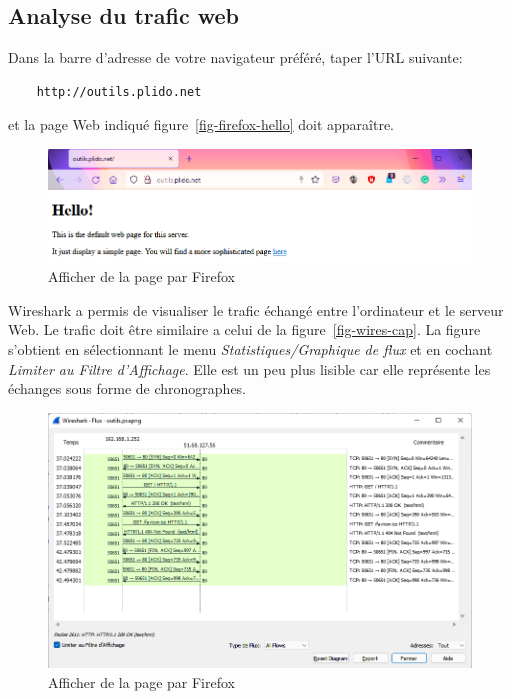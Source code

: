 \subsection{Analyse du trafic web}

Dans la barre d'adresse de votre navigateur préféré, taper l'URL suivante:

\begin{verbatim}
    http://outils.plido.net
\end{verbatim}

\noindent et la page Web indiqué figure~\vref{fig-firefox-hello} doit apparaître. 

\begin{figure}[tbp]
\centerline{\includegraphics[width=1\columnwidth]{Pictures/firefox-simple.png}}
\caption{Afficher de la page par Firefox}
\label{fig-firefox-hello}
\end{figure}

  \vspace{1em}

Wireshark a permis de visualiser le trafic échangé entre l'ordinateur et le serveur Web. Le trafic doit être similaire a celui de la figure~\vref{fig-wires-cap}. La figure s'obtient en sélectionnant le menu \textit{Statistiques/Graphique de flux} et en cochant \textit{Limiter au Filtre d'Affichage}. Elle est un peu plus lisible car elle représente les échanges sous forme de chronographes.

\begin{figure}[tbp]
\centerline{\includegraphics[width=1\columnwidth]{Pictures/ws-filtre.png}}
\caption{Afficher de la page par Firefox}
\label{fig-ws-filtre}
\end{figure}

